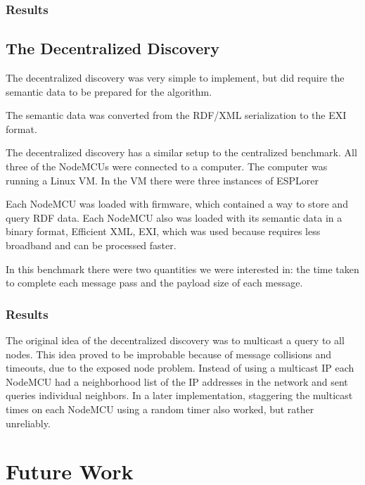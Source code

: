 \subsubsection{Results}


\subsection{The Decentralized Discovery}
The decentralized discovery was very simple to implement, but did require the semantic data to be prepared for the algorithm.

The semantic data was converted from the RDF/XML serialization to the EXI format.




The decentralized discovery has a similar setup to the centralized benchmark. All three of the NodeMCUs were connected to a computer. The computer was running a Linux VM. In the VM there were three instances of ESPLorer 

Each NodeMCU was loaded with firmware, which contained a way to store and query RDF data. Each NodeMCU also was loaded with its semantic data in a binary format, Efficient XML, EXI, which was used because requires less broadband and can be processed faster. \cite{}  

In this benchmark there were two quantities we were interested in: the time taken to complete each message pass and the payload size of each message.


\subsubsection{Results}
The original idea of the decentralized discovery was to multicast a query to all nodes. This idea proved to be improbable because of message collisions and timeouts, due to the exposed node problem.  Instead of using a multicast IP each NodeMCU had a neighborhood list of the IP addresses in the network and sent queries individual neighbors. In a later implementation, staggering the multicast times on each NodeMCU using a random timer also worked, but rather unreliably. 


\section{Future Work}


